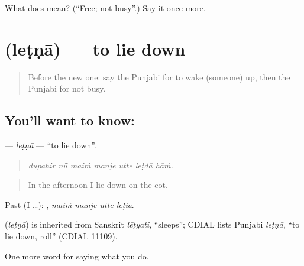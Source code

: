\begin{tcolorbox}[breakable,colback=teal!4,colframe=teal!35!black,title={Before you move on}]
What does  mean? (\textquotedblleft{}Free; not busy\textquotedblright{}.) Say it once more.
\end{tcolorbox}
\section[\texorpdfstring{\pa{ਲੇਟਣਾ} (leṭṇā)}{ਲੇਟਣਾ (leṭṇā)}]{ (leṭṇā) — to lie down}

\label{lesson:PA-C225-letna}



\begin{quote}
Before the new one: say the Punjabi for to wake (someone) up, then the Punjabi for not busy.
\end{quote}

\subsection*{You'll want to know: }
\textbf{} — \emph{leṭṇā} — \textquotedblleft{}to lie down\textquotedblright{}.

\begin{quote}
      
\end{quote}

\begin{quote}
\emph{dupahir nū̃ maiṁ manje utte leṭdā hāṁ.}
\end{quote}

\begin{quote}
In the afternoon I lie down on the cot.
\end{quote}

Past (I …):    , \emph{maiṁ manje utte leṭiā}.

\begin{cousinweb}
\textbf{} (\emph{leṭṇā}) is inherited from Sanskrit \emph{lēṭyati}, \textquotedblleft{}sleeps\textquotedblright{}; CDIAL lists Punjabi \emph{leṭṇā}, \textquotedblleft{}to lie down, roll\textquotedblright{} (CDIAL 11109).
\end{cousinweb}

\begin{grammarlens}[title={What you've built}]
One more word for saying what you do.
\end{grammarlens}

